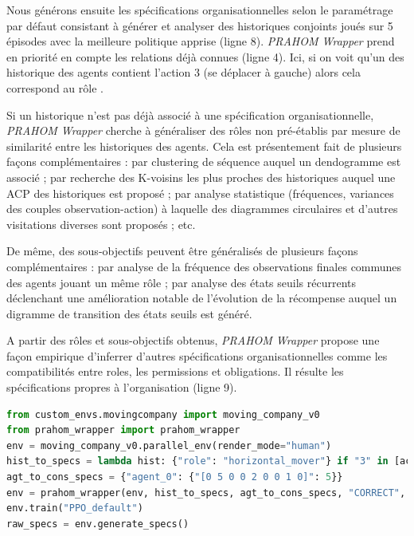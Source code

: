\documentclass[demonstration]{jfsma}
\newcounter{relation}
\begin{document}
Nous générons ensuite les spécifications organisationnelles selon le paramétrage par défaut consistant à générer et analyser des historiques conjoints joués sur 5 épisodes avec la meilleure politique apprise (ligne 8).
\emph{PRAHOM Wrapper} prend en priorité en compte les relations déjà connues (ligne 4). Ici, si on voit qu'un des historique des agents contient l'action $3$ (se déplacer à gauche) alors cela correspond au rôle .

Si un historique n'est pas déjà associé à une spécification organisationnelle, \emph{PRAHOM Wrapper} cherche à généraliser des rôles non pré-établis par mesure de similarité entre les historiques des agents. Cela est présentement fait de plusieurs façons complémentaires : par clustering de séquence auquel un dendogramme est associé ; par recherche des K-voisins les plus proches des historiques auquel une ACP des historiques est proposé ; par analyse statistique (fréquences, variances des couples observation-action) à laquelle des diagrammes circulaires et d'autres visitations diverses sont proposés ; etc.

De même, des sous-objectifs peuvent être généralisés de plusieurs façons complémentaires : par analyse de la fréquence des observations finales communes des agents jouant un même rôle ; par analyse des états seuils récurrents déclenchant une amélioration notable de l'évolution de la récompense auquel un digramme de transition des états seuils est généré.

A partir des rôles et sous-objectifs obtenus, \emph{PRAHOM Wrapper} propose une façon empirique d'inferrer d'autres spécifications organisationnelles comme les compatibilités entre roles, les permissions et obligations. Il résulte les spécifications propres à l'organisation (ligne 9).

\begin{lstlisting}[language=Python, caption={Utilisation synthétique de \emph{PRAHOM Wrapper} pour \emph{Moving Company}}, label={lst:wrapper_mc}]
from custom_envs.movingcompany import moving_company_v0
from prahom_wrapper import prahom_wrapper
env = moving_company_v0.parallel_env(render_mode="human")
hist_to_specs = lambda hist: {"role": "horizontal_mover"} if "3" in [act for obs, act in hist.items()] else None
agt_to_cons_specs = {"agent_0": {"[0 5 0 0 2 0 0 1 0]": 5}}
env = prahom_wrapper(env, hist_to_specs, agt_to_cons_specs, "CORRECT", ["sequence_clustering"], ["role", "goals"], ["dendogram", "PCA"])
env.train("PPO_default")
raw_specs = env.generate_specs()
\end{lstlisting}
\end{document}
